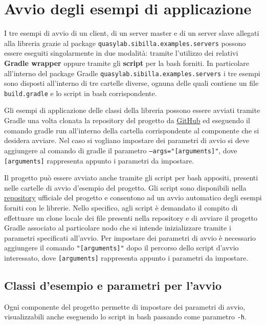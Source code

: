 \section{Avvio degli esempi di applicazione}
I tre esempi di avvio di un client, di un server master e di un server slave allegati alla libreria grazie al package \texttt{quasylab.sibilla.examples.servers} possono essere eseguiti singolarmente in due modalità: tramite l’utilizzo dei relativi \textbf{Gradle wrapper} oppure tramite gli \textbf{script} per la bash forniti. In particolare all’interno del package Gradle \texttt{quasylab.sibilla.examples.servers} i tre esempi sono disposti all’interno di tre cartelle diverse, ognuna delle quali contiene un file \texttt{build.gradle} e lo script in bash corrispondente.

Gli esempi di applicazione delle classi della libreria possono essere avviati tramite Gradle una volta clonata la repository del progetto da \href{https://github.com/quasylab/sibilla/tree/working}{GitHub} ed eseguendo il comando gradle run all’interno della cartella corrispondente al componente che si desidera avviare. Nel caso si vogliano impostare dei parametri di avvio si deve aggiungere al comando di gradle il parametro \texttt{--args="[arguments]"}, dove \texttt{[arguments]} rappresenta appunto i parametri da impostare.

Il progetto può essere avviato anche tramite gli script per bash appositi, presenti nelle cartelle di avvio d'esempio del progetto. Gli script sono disponibili nella \href{https://github.com/quasylab/sibilla/tree/working}{repository} ufficiale del progetto e consentono ad un avvio automatico degli esempi forniti con le librerie. Nello specifico, agli script è demandato il compito di effettuare un clone locale dei file presenti nella repository e di avviare il progetto Gradle associato al particolare nodo che si intende inizializzare tramite i parametri specificati all'avvio. Per impostare dei parametri di avvio è necessario aggiungere il comando \texttt{"[arguments]"} dopo il percorso dello script d'avvio interessato, dove \texttt{[arguments]} rappresenta appunto i parametri da impostare.

\subsection{Classi d'esempio e parametri per l'avvio}

Ogni componente del progetto permette di impostare dei parametri di avvio, visualizzabili anche eseguendo lo script in bash passando come parametro \texttt{-h}.

